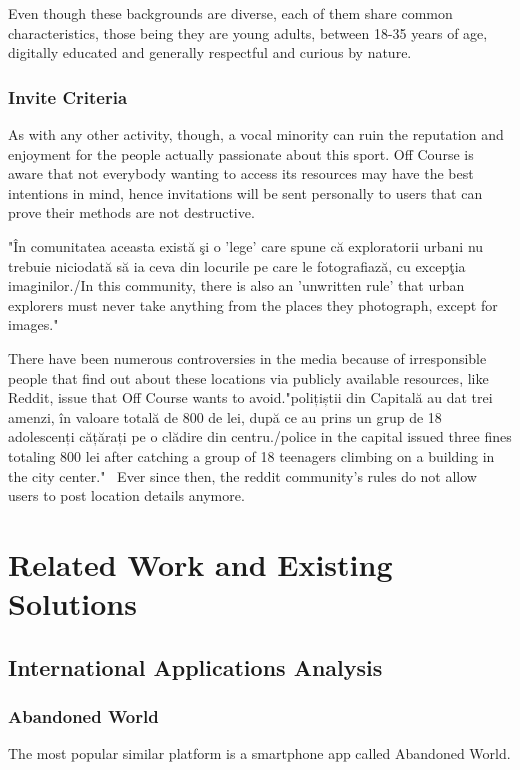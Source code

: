 \documentclass[12pt,a4paper]{report}
\begin{document}
Even though these backgrounds are diverse, each of them share common characteristics, those being they are young adults, between 18-35 years of age, digitally educated and generally respectful and curious by nature.

\subsection{Invite Criteria}
As with any other activity, though, a vocal minority can ruin the reputation and enjoyment for the people actually passionate about this sport. Off Course is aware that not everybody wanting to access its resources may have the best intentions in mind, hence invitations will be sent personally to users that can prove their methods are not destructive.

"În comunitatea aceasta există şi o 'lege' care spune că exploratorii urbani nu trebuie niciodată să ia ceva din locurile pe care le fotografiază, cu excepţia imaginilor./In this community, there is also an 'unwritten rule' that urban explorers must never take anything from the places they photograph, except for images."~\cite{articleUrbexRomania}

There have been numerous controversies in the media because of irresponsible people that find out about these locations via publicly available resources, like Reddit, issue that Off Course wants to avoid."polițiștii din Capitală au dat trei amenzi, în valoare totală de 800 de lei, după ce au prins un grup de 18 adolescenți cățărați pe o clădire din centru./police in the capital issued three fines totaling 800 lei after catching a group of 18 teenagers climbing on a building in the city center."~\cite{articleUrbexControversy} Ever since then, the reddit community's rules do not allow users to post location details anymore.

\chapter{Related Work and Existing Solutions}
\section{International Applications Analysis}
\subsection{Abandoned World}
The most popular similar platform is a smartphone app called Abandoned World.
\end{document}
